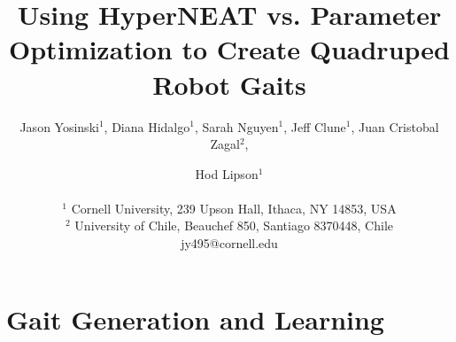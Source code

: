 \documentclass[letterpaper]{article}
\title{Using HyperNEAT vs. Parameter Optimization to Create Quadruped Robot Gaits}
\author {Jason Yosinski$^{1}$,
Diana Hidalgo$^{1}$,
Sarah Nguyen$^{1}$,
Jeff Clune$^{1}$,
Juan Cristobal Zagal$^{2}$,
\and Hod Lipson$^{1}$\\
\mbox{} \\
$^1$ Cornell University, 239 Upson Hall, Ithaca, NY  14853, USA\\
$^2$ University of Chile, Beauchef 850, Santiago 8370448, Chile\\
jy495@cornell.edu}
\begin{document}
\maketitle

\begin{abstract}

\end{abstract}












\section{Gait Generation and Learning}











\footnotesize


\end{document}
